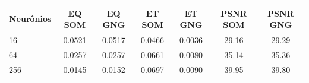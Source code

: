 \begin{tabular}{lcccccc}
\toprule
Neurônios & EQ SOM & EQ GNG & ET SOM & ET GNG & PSNR SOM & PSNR GNG\\
\midrule
16 & 0.0521 & 0.0517 & 0.0466 & 0.0036 & 29.16 & 29.29\\
64 & 0.0257 & 0.0257 & 0.0661 & 0.0080 & 35.14 & 35.36\\
256 & 0.0145 & 0.0152 & 0.0697 & 0.0090 & 39.95 & 39.80\\
\bottomrule
\end{tabular}
